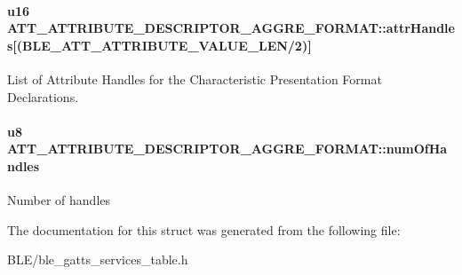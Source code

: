 \paragraph[{\texorpdfstring{attr\+Handles}{attrHandles}}]{\setlength{\rightskip}{0pt plus 5cm}u16 A\+T\+T\+\_\+\+A\+T\+T\+R\+I\+B\+U\+T\+E\+\_\+\+D\+E\+S\+C\+R\+I\+P\+T\+O\+R\+\_\+\+A\+G\+G\+R\+E\+\_\+\+F\+O\+R\+M\+A\+T\+::attr\+Handles\mbox{[}({\bf B\+L\+E\+\_\+\+A\+T\+T\+\_\+\+A\+T\+T\+R\+I\+B\+U\+T\+E\+\_\+\+V\+A\+L\+U\+E\+\_\+\+L\+EN}/2)\mbox{]}}\hypertarget{struct_a_t_t___a_t_t_r_i_b_u_t_e___d_e_s_c_r_i_p_t_o_r___a_g_g_r_e___f_o_r_m_a_t_a96e02624f4f481ab3f7cf51551ce1213}{}\label{struct_a_t_t___a_t_t_r_i_b_u_t_e___d_e_s_c_r_i_p_t_o_r___a_g_g_r_e___f_o_r_m_a_t_a96e02624f4f481ab3f7cf51551ce1213}
List of Attribute Handles for the Characteristic Presentation Format Declarations. 
\paragraph[{\texorpdfstring{num\+Of\+Handles}{numOfHandles}}]{\setlength{\rightskip}{0pt plus 5cm}u8 A\+T\+T\+\_\+\+A\+T\+T\+R\+I\+B\+U\+T\+E\+\_\+\+D\+E\+S\+C\+R\+I\+P\+T\+O\+R\+\_\+\+A\+G\+G\+R\+E\+\_\+\+F\+O\+R\+M\+A\+T\+::num\+Of\+Handles}\hypertarget{struct_a_t_t___a_t_t_r_i_b_u_t_e___d_e_s_c_r_i_p_t_o_r___a_g_g_r_e___f_o_r_m_a_t_af0eb8804b57d2943509439293baad296}{}\label{struct_a_t_t___a_t_t_r_i_b_u_t_e___d_e_s_c_r_i_p_t_o_r___a_g_g_r_e___f_o_r_m_a_t_af0eb8804b57d2943509439293baad296}
Number of handles 

The documentation for this struct was generated from the following file\+:\begin{DoxyCompactItemize}
\item 
B\+L\+E/ble\+\_\+gatts\+\_\+services\+\_\+table.\+h\end{DoxyCompactItemize}
